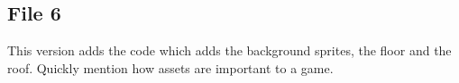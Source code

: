 \documentclass[12pt]{article}
\begin{document}
\newpage

\subsection*{File 6}
This version adds the code which adds the background sprites, the floor and the roof. Quickly mention how assets are important to a game.
\end{document}
